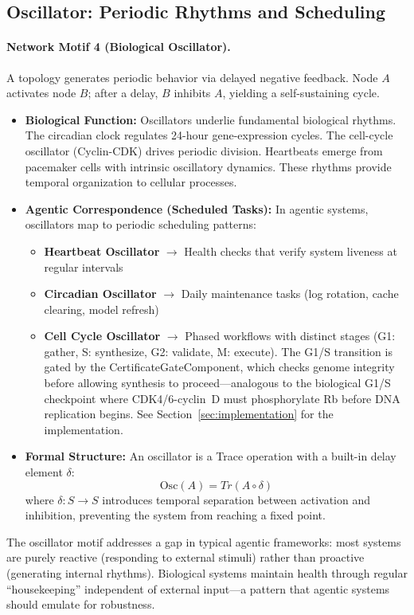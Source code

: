 \subsection{Oscillator: Periodic Rhythms and Scheduling}

\paragraph{Network Motif 4 (Biological Oscillator).}
A topology generates periodic behavior via delayed negative feedback. Node $A$ activates node $B$; after a delay, $B$ inhibits $A$, yielding a self-sustaining cycle.

\begin{itemize}[leftmargin=*]
\item \textbf{Biological Function:} Oscillators underlie fundamental biological rhythms. The circadian clock regulates 24-hour gene-expression cycles. The cell-cycle oscillator (Cyclin-CDK) drives periodic division. Heartbeats emerge from pacemaker cells with intrinsic oscillatory dynamics. These rhythms provide temporal organization to cellular processes.
\item \textbf{Agentic Correspondence (Scheduled Tasks):} In agentic systems, oscillators map to periodic scheduling patterns:
\begin{itemize}
\item \textbf{Heartbeat Oscillator} $\to$ Health checks that verify system liveness at regular intervals
\item \textbf{Circadian Oscillator} $\to$ Daily maintenance tasks (log rotation, cache clearing, model refresh)
\item \textbf{Cell Cycle Oscillator} $\to$ Phased workflows with distinct stages (G1: gather, S: synthesize, G2: validate, M: execute).  The G1/S transition is gated by the CertificateGateComponent, which checks genome integrity before allowing synthesis to proceed---analogous to the biological G1/S checkpoint where CDK4/6-cyclin~D must phosphorylate Rb before DNA replication begins.  See Section~\ref{sec:implementation} for the implementation.
\end{itemize}
\item \textbf{Formal Structure:} An oscillator is a Trace operation with a built-in delay element $\delta$:
\begin{equation}
\mathrm{Osc}(A) = Tr(A \circ \delta)
\label{eq:oscillator-trace}
\end{equation}
where $\delta: S \to S$ introduces temporal separation between activation and inhibition, preventing the system from reaching a fixed point.
\end{itemize}

The oscillator motif addresses a gap in typical agentic frameworks: most systems are purely reactive (responding to external stimuli) rather than proactive (generating internal rhythms). Biological systems maintain health through regular ``housekeeping'' independent of external input---a pattern that agentic systems should emulate for robustness.
